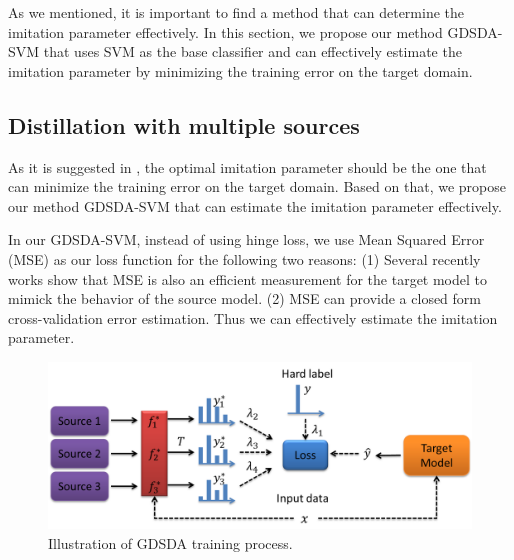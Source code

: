 As we mentioned, it is important to find a method that can determine the imitation parameter effectively. In this section, we propose our method GDSDA-SVM that uses SVM as the base classifier and can effectively estimate the imitation parameter by minimizing the training error on the target domain.
\subsection{Distillation with multiple sources}
As it is suggested in \cite{vapnik2015learning}, the optimal imitation parameter should be the one that can minimize the training error on the target domain. Based on that, we propose our method GDSDA-SVM that can estimate the imitation parameter effectively.

In our GDSDA-SVM, instead of using hinge loss, we use Mean Squared Error (MSE) as our loss function for the following two reasons: (1) Several recently works \cite{ba2014deep,luo2016face,romero2014fitnets,urban2016deep} show that MSE is also an efficient measurement for the target model to mimick the behavior of the source model. (2) MSE can provide a closed form cross-validation error estimation. Thus we can effectively estimate the imitation parameter. 

\begin{figure}
\centering
\includegraphics[scale=.4]{figure/multi-GDDA.png}
\caption{Illustration of GDSDA training process.}
\end{figure}

